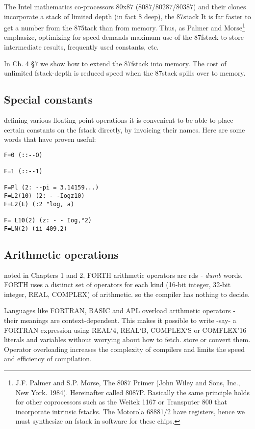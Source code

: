 The Intel mathematics co-processors 80x87 (8087/80287/80387)
and their clones incorporate a stack of limited depth (in fact 8
deep), the 87stack It is far faster to get a number from the 875tack
than from memory. Thus, as Palmer and Morse\footnote{J.F. Palmer and S.P. Morse, The 8087 Primer (John Wiley and Sons, Inc., New York. 1984).
Hereinafter called 8087P. Basically the same principle holds for other coprocessors such as
the Weitek 1167 or Transputer 800 that incorporate intrinsic fstacks. The Motorola 68881/2 have
registers, hence we must synthesize an fstack in software for these chips.} emphasize,
optimizing for speed demands maximum use of the 87fstack to
store intermediate results, frequently used constants, etc.

In Ch. 4 §7 we show how to extend the 87fstack into memory. The
cost of unlimited fstack-depth is reduced speed when the 87stack
spills over to memory.

\subsection{Special constants}
defining various floating point operations it is convenient to be
able to place certain constants on the fstack directly, by invoicing
their names. Here are some words that have proven useful:
\begin{verbatim}
F=0 (::--O)

F=1 (::--1)

F=Pl (2: --pi = 3.14159...)
F=L2(10) (2: - -Iogz10)
F=L2(E) (:2 "log, a)

F= L10(2) (z: - - Iog,°2)
F=LN(2) (ii-409.2)
\end{verbatim}
 
\subsection{Arithmetic operations}
noted in Chapters 1 and 2, FORTH arithmetic operators are
rds \textit{- dumb} words. FORTH uses a distinct set of operators
for each kind (16-bit integer, 32-bit integer, REAL, COMPLEX)
of arithmetic. so the compiler has nothing to decide.

Languages like FORTRAN, BASIC and APL overload arithmetic operators - their
meanings are context-dependent. This
makes it possible to write -say- a FORTRAN expression using
REAL‘4, REAL‘B, COMPLEX‘S or COMFLEX’16 literals
and variables without worrying about how to fetch. store or
convert them. Operator overloading increases the complexity of
compilers and limits the speed and efficiency of compilation.


